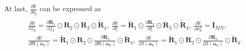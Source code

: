 \documentclass[12pt, draftclsnofoot, onecolumn]{IEEEtran}
\begin{document}
At last, $\frac{\partial \mathbb{R}}{\partial {{\eta }_{l}}}$ can be expressed as
\begin{align}
 & \frac{\partial \mathbb{R}}{\partial {{f}_{d}}}=\frac{\partial {{{\mathbf{\tilde{R}}}}_{1}}}{\partial {{f}_{d}}}\odot {{\mathbf{R}}_{2}}\odot {{\mathbf{R}}_{3}}\odot {{{\mathbf{\tilde{R}}}}_{4}},\
\frac{\partial \mathbb{R}}{\partial \xi } ={{{\mathbf{\tilde{R}}}}_{1}}\odot \frac{\partial {{\mathbf{R}}_{2}}}{\partial \xi }\odot {{\mathbf{R}}_{3}}\odot {{{\mathbf{\tilde{R}}}}_{4}},\ \frac{\partial \mathbb{R}}{\partial {{\sigma }_{\mathrm{n}}^{2}}} ={{\mathbf{I}}_{MN}}, \nonumber \\
 & \frac{\partial \mathbb{R}}{\partial \Re \left( {{\mathbf{\alpha }}_{k}} \right)} ={{{\mathbf{\tilde{R}}}}_{1}}\odot {{\mathbf{R}}_{2}}\odot \frac{\partial {{\mathbf{R}}_{3}}}{\partial \Re \left( {{\mathbf{\alpha }}_{k}} \right)}\odot {{{\mathbf{\tilde{R}}}}_{4}},\
\frac{\partial \mathbb{R}}{\partial \Im \left( {{\mathbf{\alpha }}_{k}} \right)} ={{{\mathbf{\tilde{R}}}}_{1}}\odot {{\mathbf{R}}_{2}}\odot \frac{\partial {{\mathbf{R}}_{3}}}{\partial \Im \left( {{\mathbf{\alpha }}_{k}} \right)}\odot {{{\mathbf{\tilde{R}}}}_{4}}.
\end{align}
\end{document}
